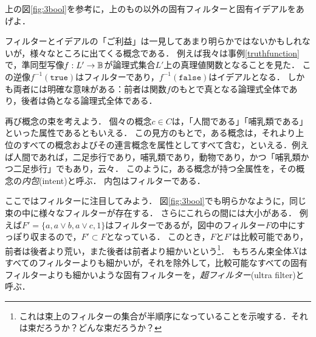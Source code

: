 \documentclass[11pt,a4paper]{jsarticle}
\begin{document}
\begin{exercise}
上の図\ref{fig:3bool}を参考に，上のもの以外の固有フィルターと固有イデアルをあげよ．
\end{exercise}

フィルターとイデアルの「ご利益」は一見してあまり明らかではないかもしれないが，様々なところに出てくる概念である．
例えば我々は事例\ref{truthfunction}で，準同型写像$f:L' \to \mathbb{B}$が論理式集合$L'$上の真理値関数となることを見た．
この逆像$f^{-1}(\texttt{true})$はフィルターであり，$f^{-1}(\texttt{false})$はイデアルとなる．
しかも両者には明確な意味がある：前者は関数$f$のもとで真となる論理式全体であり，後者は偽となる論理式全体である．

\begin{example}[概念の内包]
再び概念の束を考えよう．
個々の概念$c \in C$は，「人間である」「哺乳類である」といった属性であるともいえる．
この見方のもとで，ある概念は，それより上位のすべての概念およびその連言概念を属性としてすべて含む，といえる．例えば人間であれば，二足歩行であり，哺乳類であり，動物であり，かつ「哺乳類かつ二足歩行」でもあり，云々．
このように，ある概念が持つ全属性を，その概念の\emph{内包}(intent)と呼ぶ．
内包はフィルターである．
\end{example}


ここではフィルターに注目してみよう．
図\ref{fig:3bool}でも明らかなように，同じ束の中に様々なフィルターが存在する．
さらにこれらの間には大小がある．
例えば$F' = \{a, a\vee b, a \vee c, 1\}$はフィルターであるが，図中のフィルター$F$の中にすっぽり収まるので，$F' \subset F$となっている．
このとき，$F$と$F'$は比較可能であり，前者は後者より荒い，また後者は前者より細かいという\footnote{これは束上のフィルターの集合が半順序になっていることを示唆する．それは束だろうか？どんな束だろうか？}．
もちろん束全体$X$はすべてのフィルターよりも細かいが，それを除外して，比較可能なすべての固有フィルターよりも細かいような固有フィルターを，\emph{超フィルター}(ultra filter)と呼ぶ．
\end{document}
